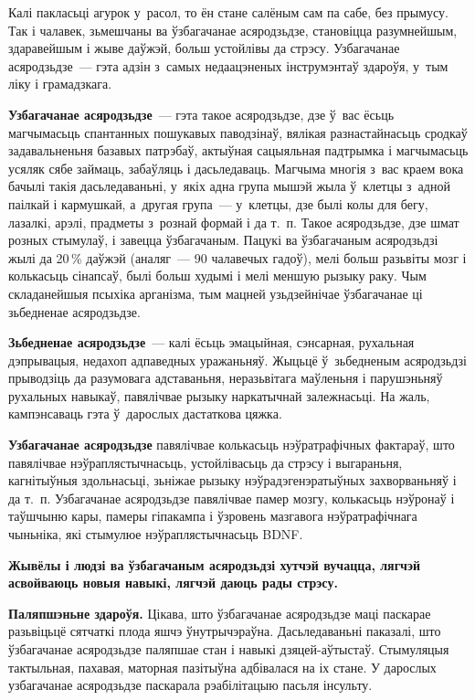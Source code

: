 Калі пакласьці агурок у~расол, то ён стане салёным сам па сабе, без прымусу. Так і чалавек, зьмешчаны ва ўзбагачанае асяродзьдзе, становіцца разумнейшым, здаравейшым і жыве даўжэй, больш устойлівы да стрэсу. Узбагачанае асяродзьдзе~--- гэта адзін з~самых недаацэненых інструмэнтаў здароўя, у~тым ліку і грамадзкага.

\textbf{Узбагачанае асяродзьдзе}~--- гэта такое асяродзьдзе, дзе ў~вас ёсьць магчымасьць спантанных пошукавых паводзінаў, вялікая разнастайнасьць сродкаў задавальненьня базавых патрэбаў, актыўная сацыяльная падтрымка і магчымасьць усяляк сябе займаць, забаўляць і дасьледаваць. Магчыма многія з~вас краем вока бачылі такія дасьледаваньні, у~якіх адна група мышэй жыла ў~клетцы з~адной паілкай і кармушкай, а~другая група~--- у~клетцы, дзе былі колы для бегу, лазалкі, арэлі, прадметы з~рознай формай і да т.~п. Такое асяродзьдзе, дзе шмат розных стымулаў, і завецца ўзбагачаным. Пацукі ва ўзбагачаным асяродзьдзі жылі да 20\,\% даўжэй (аналяг~--- 90 чалавечых гадоў), мелі больш разьвіты мозг і колькасьць сінапсаў, былі больш худымі і мелі меншую рызыку раку. Чым складанейшыя псыхіка арганізма, тым мацней узьдзейнічае ўзбагачанае ці зьбедненае асяродзьдзе.

\textbf{Зьбедненае асяродзьдзе}~--- калі ёсьць эмацыйная, сэнсарная, рухальная дэпрывацыя, недахоп адпаведных уражаньняў. Жыцьцё ў~зьбедненым асяродзьдзі прыводзіць да разумовага адставаньня, неразьвітага маўленьня і парушэньняў рухальных навыкаў, павялічвае рызыку наркатычнай залежнасьці. На жаль, кампэнсаваць гэта ў~дарослых дастаткова цяжка.

\textbf{Узбагачанае асяродзьдзе} павялічвае колькасьць нэўратрафічных фактараў, што павялічвае нэўраплястычнасьць, устойлівасьць да стрэсу і выгараньня, кагнітыўныя здольнасьці, зьніжае рызыку нэўрадэгенэратыўных захворваньняў і да т.~п. Узбагачанае асяродзьдзе павялічвае памер мозгу, колькасьць нэўронаў і таўшчыню кары, памеры гіпакампа і ўзровень мазгавога нэўратрафічнага чыньніка, які стымулюе нэўраплястычнасьць BDNF. 

\textbf{Жывёлы і людзі ва ўзбагачаным асяродзьдзі хутчэй вучацца, лягчэй асвойваюць новыя навыкі, лягчэй даюць рады стрэсу.} 

\textbf{Паляпшэньне здароўя.} Цікава, што ўзбагачанае асяродзьдзе маці паскарае разьвіцьцё сятчаткі плода яшчэ ўнутрычэраўна. Дасьледаваньні паказалі, што ўзбагачанае асяродзьдзе паляпшае стан і навыкі дзяцей-аўтыстаў. Стымуляцыя тактыльная, пахавая, маторная пазітыўна адбівалася на іх стане. У дарослых узбагачанае асяродзьдзе паскарала рэабілітацыю пасьля інсульту.

